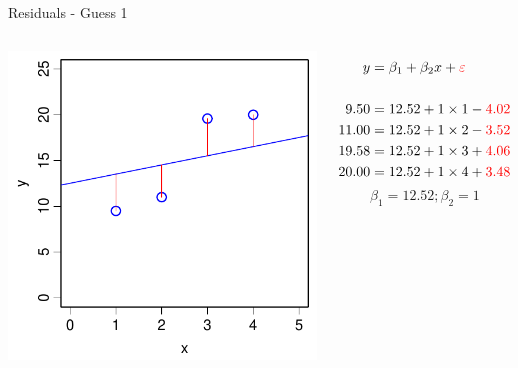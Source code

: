 \documentclass[xcolor=x11names,compress]{beamer}
\renewcommand{\(}{\begin{columns}}
\renewcommand{\)}{\end{columns}}
\newcommand{\<}[1]{\begin{column}{#1}}
\renewcommand{\>}{\end{column}}
\begin{document}

\begin{frame}{Residuals - Guess 1}
    \begin{columns}[T]
   
           \includegraphics[width=\textwidth]{TooFlat.pdf}
           
           \begin{align*}
             y  &= \beta_1 + \beta_2 x  + {\color{red} \varepsilon }\\
             \\
             9.50  &= 12.52 + 1 \times 1 - {\color{red} 4.02}\\
             11.00 &= 12.52 + 1 \times 2 - {\color{red} 3.52}\\
             19.58 &= 12.52 + 1 \times 3 + {\color{red} 4.06}\\
             20.00 &= 12.52 + 1 \times 4 + {\color{red} 3.48} 
           \end{align*}
           \[\beta_1 = 12.52; \beta_2=1\]
   
   \end{columns}
   \end{frame}

\end{document}
